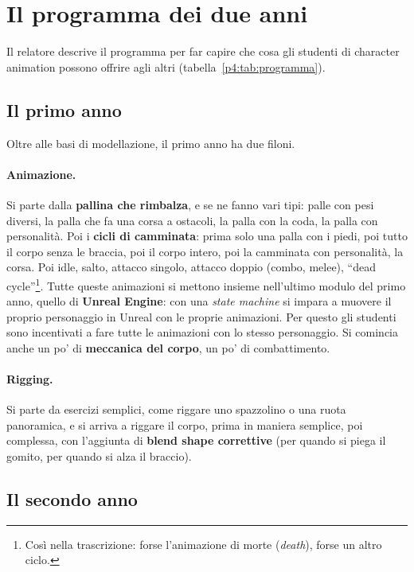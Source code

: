 \section{Il programma dei due anni}
\label{p4:sec:programma}

Il relatore descrive il programma per far capire che cosa gli studenti di
character animation possono offrire agli altri (tabella~\ref{p4:tab:programma}).

\subsection{Il primo anno}

Oltre alle basi di modellazione, il primo anno ha due filoni.

\paragraph{Animazione.} Si parte dalla \textbf{pallina che rimbalza}, e se ne
fanno vari tipi: palle con pesi diversi, la palla che fa una corsa a ostacoli,
la palla con la coda, la palla con personalità. Poi i \textbf{cicli di
camminata}: prima solo una palla con i piedi, poi tutto il corpo senza le
braccia, poi il corpo intero, poi la camminata con personalità, la corsa. Poi
idle, salto, attacco singolo, attacco doppio (combo, melee), ``dead
cycle''\footnote{Così nella trascrizione: forse l'animazione di morte
(\emph{death}), forse un altro ciclo.}. Tutte queste animazioni si mettono
insieme nell'ultimo modulo del primo anno, quello di \textbf{Unreal Engine}:
con una \emph{state machine} si impara a muovere il proprio personaggio in
Unreal con le proprie animazioni. Per questo gli studenti sono incentivati a
fare tutte le animazioni con lo stesso personaggio. Si comincia anche un po'
di \textbf{meccanica del corpo}, un po' di combattimento.

\paragraph{Rigging.} Si parte da esercizi semplici, come riggare uno
spazzolino o una ruota panoramica, e si arriva a riggare il corpo, prima in
maniera semplice, poi complessa, con l'aggiunta di \textbf{blend shape
correttive} (per quando si piega il gomito, per quando si alza il braccio).

\subsection{Il secondo anno}

